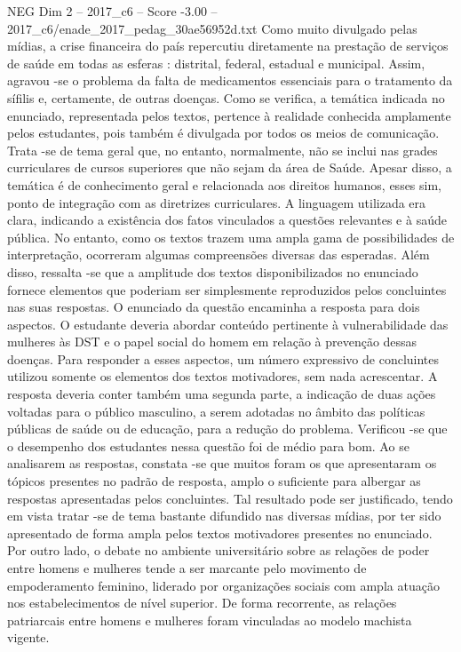 \begin{textsample}{NEG Dim 2 – 2017\_c6 – Score -3.00 – 2017\_c6/enade\_2017\_pedag\_30ae56952d.txt}
Como muito divulgado pelas mídias, a crise financeira do país repercutiu diretamente na prestação de serviços de saúde em todas as esferas : distrital, federal, estadual e municipal.
Assim, agravou -se o problema da falta de medicamentos essenciais para o tratamento da sífilis e, certamente, de outras doenças.
Como se verifica, a temática indicada no enunciado, representada pelos textos, pertence à realidade conhecida amplamente pelos estudantes, pois também é divulgada por todos os meios de comunicação.
Trata -se de tema geral que, no entanto, normalmente, não se inclui nas grades curriculares de cursos superiores que não sejam da área de Saúde.
Apesar disso, a temática é de conhecimento geral e relacionada aos direitos humanos, esses sim, ponto de integração com as diretrizes curriculares.
A linguagem utilizada era clara, indicando a existência dos fatos vinculados a questões relevantes e à saúde pública.
No entanto, como os textos trazem uma ampla gama de possibilidades de interpretação, ocorreram algumas compreensões diversas das esperadas.
Além disso, ressalta -se que a amplitude dos textos disponibilizados no enunciado fornece elementos que poderiam ser simplesmente reproduzidos pelos concluintes nas suas respostas.
O enunciado da questão encaminha a resposta para dois aspectos.
O estudante deveria abordar conteúdo pertinente à vulnerabilidade das mulheres às DST e o papel social do homem em relação à prevenção dessas doenças.
Para responder a esses aspectos, um número expressivo de concluintes utilizou somente os elementos dos textos motivadores, sem nada acrescentar.
A resposta deveria conter também uma segunda parte, a indicação de duas ações voltadas para o público masculino, a serem adotadas no âmbito das políticas públicas de saúde ou de educação, para a redução do problema.
Verificou -se que o desempenho dos estudantes nessa questão foi de médio para bom.
Ao se analisarem as respostas, constata -se que muitos foram os que apresentaram os tópicos presentes no padrão de resposta, amplo o suficiente para albergar as respostas apresentadas pelos concluintes.
Tal resultado pode ser justificado, tendo em vista tratar -se de tema bastante difundido nas diversas mídias, por ter sido apresentado de forma ampla pelos textos motivadores presentes no enunciado.
Por outro lado, o debate no ambiente universitário sobre as relações de poder entre homens e mulheres tende a ser marcante pelo movimento de empoderamento feminino, liderado por organizações sociais com ampla atuação nos estabelecimentos de nível superior.
De forma recorrente, as relações patriarcais entre homens e mulheres foram vinculadas ao modelo machista vigente.

\end{textsample}
